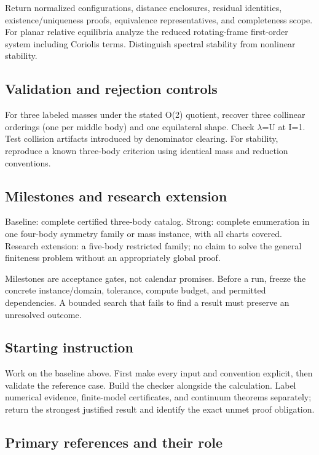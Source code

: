 \documentclass[
  11pt,
]{article}
\begin{document}
Return normalized configurations, distance enclosures, residual
identities, existence/uniqueness proofs, equivalence representatives,
and completeness scope. For planar relative equilibria analyze the
reduced rotating-frame first-order system including Coriolis terms.
Distinguish spectral stability from nonlinear stability.

\subsection{Validation and rejection controls}

For three labeled masses under the stated O(2) quotient, recover three
collinear orderings (one per middle body) and one equilateral shape.
Check \ensuremath{\lambda}=U at I=1. Test collision artifacts introduced
by denominator clearing. For stability, reproduce a known three-body
criterion using identical mass and reduction conventions.

\subsection{Milestones and research extension}

Baseline: complete certified three-body catalog. Strong: complete
enumeration in one four-body symmetry family or mass instance, with all
charts covered. Research extension: a five-body restricted family; no
claim to solve the general finiteness problem without an appropriately
global proof.

Milestones are acceptance gates, not calendar promises. Before a run,
freeze the concrete instance/domain, tolerance, compute budget, and
permitted dependencies. A bounded search that fails to find a result
must preserve an unresolved outcome.

\subsection{Starting instruction}

Work on the baseline above. First make every input and convention
explicit, then validate the reference case. Build the checker alongside
the calculation. Label numerical evidence, finite-model certificates,
and continuum theorems separately; return the strongest justified result
and identify the exact unmet proof obligation.

\subsection{Primary references and their role}
\end{document}
